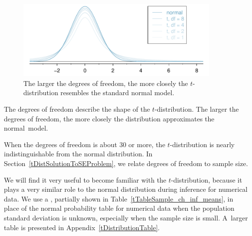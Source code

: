 \begin{figure}[h]
\centering
\includegraphics[width=0.9\textwidth]{ch_inference_for_means/figures/tDistConvergeToNormalDist/tDistConvergeToNormalDist}
\caption{The larger the degrees of freedom, the more closely the $t$-distribution resembles the standard normal model.}
\label{tDistConvergeToNormalDist}
\end{figure}

\begin{termBox}{
The degrees of freedom describe the shape of the $t$-distribution. The larger the degrees of freedom, the more closely the distribution approximates the normal~model.}
\end{termBox}

When the degrees of freedom is about 30 or more, the $t$-distribution is nearly indistinguishable from the normal distribution. In Section~\ref{tDistSolutionToSEProblem}, we relate degrees of freedom to sample size.

We will find it very useful to become familiar with the $t$-distribution, because it plays a very similar role to the normal distribution during inference for numerical data. We use a , partially shown in Table~\ref{tTableSample_ch_inf_means}, in place of the normal probability table for numerical data when the population standard deviation is unknown, especially when the sample size is small. A~larger table is presented in Appendix~\ref{tDistributionTable}.


